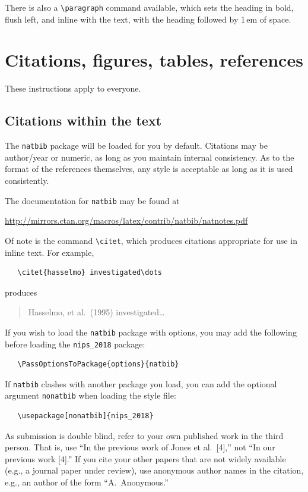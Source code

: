 \documentclass{article}
\begin{document}
There is also a \verb+\paragraph+ command available, which sets the
heading in bold, flush left, and inline with the text, with the
heading followed by 1\,em of space.

\section{Citations, figures, tables, references}
\label{others}

These instructions apply to everyone.

\subsection{Citations within the text}

The \verb+natbib+ package will be loaded for you by default.
Citations may be author/year or numeric, as long as you maintain
internal consistency.  As to the format of the references themselves,
any style is acceptable as long as it is used consistently.

The documentation for \verb+natbib+ may be found at
\begin{center}
  \url{http://mirrors.ctan.org/macros/latex/contrib/natbib/natnotes.pdf}
\end{center}
Of note is the command \verb+\citet+, which produces citations
appropriate for use in inline text.  For example,
\begin{verbatim}
   \citet{hasselmo} investigated\dots
\end{verbatim}
produces
\begin{quote}
  Hasselmo, et al.\ (1995) investigated\dots
\end{quote}

If you wish to load the \verb+natbib+ package with options, you may
add the following before loading the \verb+nips_2018+ package:
\begin{verbatim}
   \PassOptionsToPackage{options}{natbib}
\end{verbatim}

If \verb+natbib+ clashes with another package you load, you can add
the optional argument \verb+nonatbib+ when loading the style file:
\begin{verbatim}
   \usepackage[nonatbib]{nips_2018}
\end{verbatim}

As submission is double blind, refer to your own published work in the
third person. That is, use ``In the previous work of Jones et
al.\ [4],'' not ``In our previous work [4].'' If you cite your other
papers that are not widely available (e.g., a journal paper under
review), use anonymous author names in the citation, e.g., an author
of the form ``A.\ Anonymous.''
\end{document}

